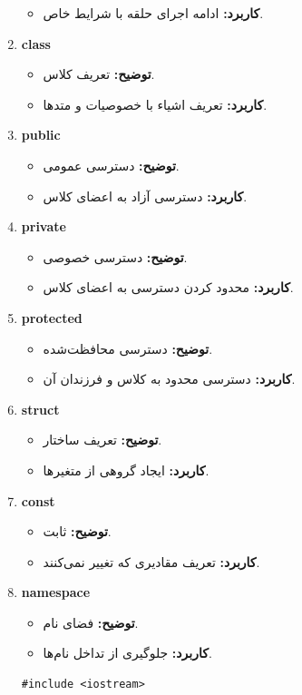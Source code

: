 \documentclass[12pt, a4paper]{report}
\begin{document}
\begin{enumerate}
\begin{itemize}
		\item \textbf{کاربرد:} ادامه اجرای حلقه با شرایط خاص.
	\end{itemize}
	\item \textbf{class}
	\begin{itemize}
		\item \textbf{توضیح:} تعریف کلاس.
		\item \textbf{کاربرد:} تعریف اشیاء با خصوصیات و متدها.
	\end{itemize}
	\item \textbf{public}
	\begin{itemize}
		\item \textbf{توضیح:} دسترسی عمومی.
		\item \textbf{کاربرد:} دسترسی آزاد به اعضای کلاس.
	\end{itemize}
	\item \textbf{private}
	\begin{itemize}
		\item \textbf{توضیح:} دسترسی خصوصی.
		\item \textbf{کاربرد:} محدود کردن دسترسی به اعضای کلاس.
	\end{itemize}
	\item \textbf{protected}
	\begin{itemize}
		\item \textbf{توضیح:} دسترسی محافظت‌شده.
		\item \textbf{کاربرد:} دسترسی محدود به کلاس و فرزندان آن.
	\end{itemize}
	\item \textbf{struct}
	\begin{itemize}
		\item \textbf{توضیح:} تعریف ساختار.
		\item \textbf{کاربرد:} ایجاد گروهی از متغیرها.
	\end{itemize}
	\item \textbf{const}
	\begin{itemize}
		\item \textbf{توضیح:} ثابت.
		\item \textbf{کاربرد:} تعریف مقادیری که تغییر نمی‌کنند.
	\end{itemize}
	\item \textbf{namespace}
	\begin{itemize}
		\item \textbf{توضیح:} فضای نام.
		\item \textbf{کاربرد:} جلوگیری از تداخل نام‌ها.
	\end{itemize}
	\LTR
	\begin{lstlisting}[breaklines=true]
	#include <iostream>
	

\end{lstlisting}
\end{enumerate}
\end{document}
